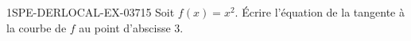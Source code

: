 \begin{exercice}{1SPE-DERLOCAL-EX-037}{1}{5}
Soit $f(x)=x^2$. Écrire l'équation de la tangente à la courbe de $f$ au point d'abscisse $3$.
\end{exercice}
